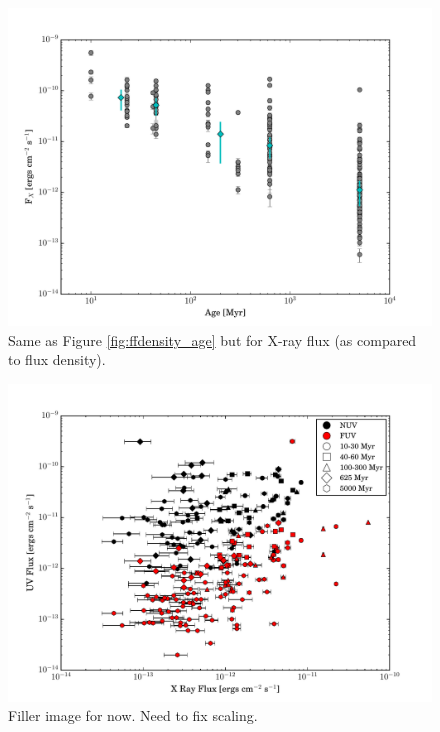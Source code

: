 \documentclass[twocolumn]{aastex62}
\begin{document}
\begin{figure}[t]
\centering
\includegraphics[width=\linewidth]{xray_evolution.pdf}
\caption{Same as Figure \ref{fig:ffdensity_age} but for X-ray flux (as compared to flux density). \label{fig:xray_evolution}}
\end{figure}

\begin{figure}[t]
\centering
\includegraphics[width=\linewidth]{uv_vs_xray_NO_J.pdf}
\caption{Filler image for now. Need to fix scaling. \label{fig:uv_vs_xray}}
\end{figure}
\end{document}
